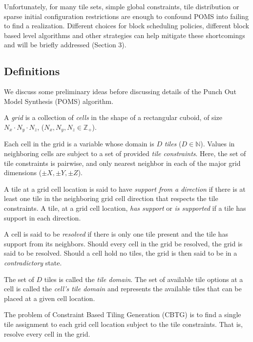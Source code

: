 Unfortunately, for many tile sets, simple global constraints, tile distribution or sparse initial configuration restrictions
are enough to
confound POMS into failing to find a realization.
Different choices for block scheduling policies, 
different block based level algorithms and other strategies
can help mitigate these shortcomings and will be briefly addressed (Section 3).


\subsection{Definitions}

We discuss some preliminary ideas before discussing details
of the Punch Out Model Synthesis (POMS) algorithm.

A \textit{grid} is a collection of \textit{cells} in the shape of a rectangular cuboid,
of size $N_x \cdot N_y \cdot N_z$, ($N_x, N_y, N_z \in \mathbb{Z}_{+}$).

Each cell in the grid is a variable whose domain is $D$ \textit{tiles} ($D \in \mathbb{N}$).
Values in neighboring cells are subject to a set of provided \textit{tile constraints}.
%
%
Here, the set of tile constraints is pairwise, and only nearest neighbor in each of the major grid dimensions ($\pm X, \pm Y, \pm Z$).

A tile at a grid cell location is said to have \textit{support from a direction} if there is at least
one tile in the neighboring grid cell direction that respects the tile constraints.
A tile, at a grid cell location, \textit{has support} or \textit{is supported} if a tile has support in each direction.

A cell is said to be \textit{resolved} if there is only one tile present and the tile has support from its neighbors.
Should every cell in the grid be resolved, the grid is said to be resolved.
Should a cell hold no tiles, the grid is then said to be in a \textit{contradictory} state.

The set of $D$ tiles is called the \textit{tile domain}.
The set of available tile options at a cell is called the \textit{cell's tile domain} and represents the
available tiles that can be placed at a given cell location.


The problem of Constraint Based Tiling Generation (CBTG) is to
find a single tile assignment to each grid cell location subject to the tile constraints.
That is, resolve every cell in the grid.


